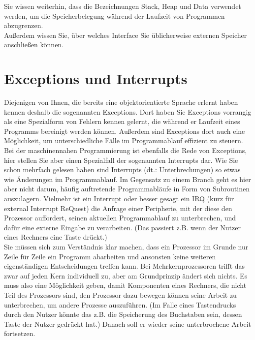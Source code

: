 Sie wissen weiterhin, dass die Bezeichnungen Stack, Heap und Data verwendet werden, um die Speicherbelegung während der Laufzeit von Programmen abzugrenzen.\\

Außerdem wissen Sie, über welches Interface Sie üblicherweise externen Speicher anschließen können.

\section{Exceptions und Interrupts}

Diejenigen von Ihnen, die bereits eine objektorientierte Sprache erlernt haben kennen deshalb die sogenannten Exceptions. Dort haben Sie Exceptions vorrangig als eine Spezialform von Fehlern kennen gelernt, die während er Laufzeit eines Programms bereinigt werden können. Außerdem sind Exceptions dort auch eine Möglichkeit, um unterschiedliche Fälle im Programmablauf effizient zu steuern.\\

Bei der maschinennahen Programmierung ist ebenfalls die Rede von Exceptions, hier stellen Sie aber einen Spezialfall der sogenannten Interrupts dar. Wie Sie schon mehrfach gelesen haben sind Interrupts (dt.: Unterbrechungen) so etwas wie Änderungen im Programmablauf. Im Gegensatz zu einem Branch geht es hier aber nicht darum, häufig auftretende Programmabläufe in Form von Subroutinen auszulagern. Vielmehr ist ein Interrupt oder besser gesagt ein IRQ (kurz für external Interrupt ReQuest) die Anfrage einer Peripherie, mit der diese den Prozessor auffordert, seinen aktuellen Programmablauf zu unterbrechen, und dafür eine externe Eingabe zu verarbeiten. (Das passiert z.B. wenn der Nutzer eines Rechners eine Taste drückt.)\\

Sie müssen sich zum Verständnis klar machen, dass ein Prozessor im Grunde nur Zeile für Zeile ein Programm abarbeiten und ansonsten keine weiteren eigenständigen Entscheidungen treffen kann. Bei Mehrkernprozessoren trifft das zwar auf jeden Kern individuell zu, aber am Grundprinzip ändert sich nichts. Es muss also eine Möglichkeit geben, damit Komponenten eines Rechners, die nicht Teil des Prozessors sind, den Prozessor dazu bewegen können seine Arbeit zu unterbrechen, um andere Prozesse auszuführen. (Im Falle eines Tastendrucks durch den Nutzer könnte das z.B. die Speicherung des Buchstaben sein, dessen Taste der Nutzer gedrückt hat.) Danach soll er wieder seine unterbrochene Arbeit fortsetzen.\\


